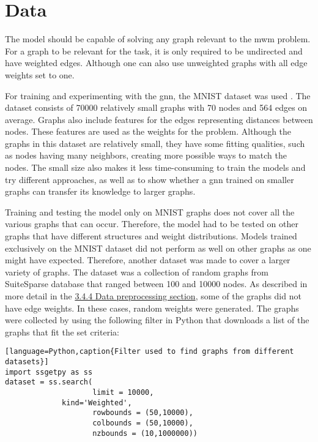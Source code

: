\section{Data}
\label{sec:dataanalysis}
The model should be capable of solving any graph relevant to the \gls{mwm} problem. For a graph to be relevant for the task, it is only required to be undirected and have weighted edges. Although one can also use unweighted graphs with all edge weights set to one.

For training and experimenting with the \gls{gnn}, the MNIST dataset was used \cite{dwivedi2022benchmarking}. The dataset consists of 70000 relatively small graphs with 70 nodes and 564 edges on average. Graphs also include features for the edges representing distances between nodes. These features are used as the weights for the problem. Although the graphs in this dataset are relatively small, they have some fitting qualities, such as nodes having many neighbors, creating more possible ways to match the nodes. The small size also makes it less time-consuming to train the models and try different approaches, as well as to show whether a \gls{gnn} trained on smaller graphs can transfer its knowledge to larger graphs.

Training and testing the model only on MNIST graphs does not cover all the various graphs that can occur. Therefore, the model had to be tested on other graphs that have different structures and weight distributions. Models trained exclusively on the MNIST dataset did not perform as well on other graphs as one might have expected. Therefore, another dataset was made to cover a larger variety of graphs. The dataset was a collection of random graphs from SuiteSparse database that ranged between 100 and 10000 nodes. As described in more detail in the \hyperref[sec:preprocessing]{3.4.4 Data preprocessing section}, some of the graphs did not have edge weights. In these cases, random weights were generated. The graphs were collected by using the following filter in Python that downloads a list of the graphs that fit the set criteria:

\begin{lstlisting}[language=Python,caption{Filter used to find graphs from different datasets}]
import ssgetpy as ss
dataset = ss.search( 
                    limit = 10000, 
	         kind='Weighted',
                    rowbounds = (50,10000),
                    colbounds = (50,10000),
                    nzbounds = (10,1000000))
\end{lstlisting}


